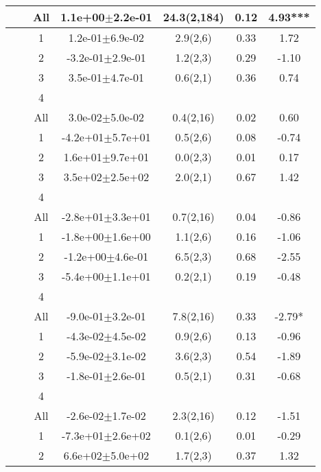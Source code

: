 \begin{longtable}{llccccS[table-format=-2.2, table-space-text-post = {***}]}
   &  & All &  1.1e+00$\pm$2.2e-01 & 24.3(2,184) & 0.12 & 4.93*** \\ 
   \midrule
{} & {} & 1 &  1.2e-01$\pm$6.9e-02 & 2.9(2,6) & 0.33 & 1.72 \\ 
   &  & 2 & -3.2e-01$\pm$2.9e-01 & 1.2(2,3) & 0.29 & -1.10 \\ 
   &  & 3 &  3.5e-01$\pm$4.7e-01 & 0.6(2,1) & 0.36 & 0.74 \\ 
   &  & 4 &  &  &  &  \\ 
   &  & All &  3.0e-02$\pm$5.0e-02 & 0.4(2,16) & 0.02 & 0.60 \\ 
   \midrule
{} & {} & 1 & -4.2e+01$\pm$5.7e+01 & 0.5(2,6) & 0.08 & -0.74 \\ 
   &  & 2 &  1.6e+01$\pm$9.7e+01 & 0.0(2,3) & 0.01 & 0.17 \\ 
   &  & 3 &  3.5e+02$\pm$2.5e+02 & 2.0(2,1) & 0.67 & 1.42 \\ 
   &  & 4 &  &  &  &  \\ 
   &  & All & -2.8e+01$\pm$3.3e+01 & 0.7(2,16) & 0.04 & -0.86 \\ 
   \midrule
{} & {} & 1 & -1.8e+00$\pm$1.6e+00 & 1.1(2,6) & 0.16 & -1.06 \\ 
   &  & 2 & -1.2e+00$\pm$4.6e-01 & 6.5(2,3) & 0.68 & -2.55 \\ 
   &  & 3 & -5.4e+00$\pm$1.1e+01 & 0.2(2,1) & 0.19 & -0.48 \\ 
   &  & 4 &  &  &  &  \\ 
   &  & All & -9.0e-01$\pm$3.2e-01 & 7.8(2,16) & 0.33 & -2.79* \\ 
   \midrule
{} & {} & 1 & -4.3e-02$\pm$4.5e-02 & 0.9(2,6) & 0.13 & -0.96 \\ 
   &  & 2 & -5.9e-02$\pm$3.1e-02 & 3.6(2,3) & 0.54 & -1.89 \\ 
   &  & 3 & -1.8e-01$\pm$2.6e-01 & 0.5(2,1) & 0.31 & -0.68 \\ 
   &  & 4 &  &  &  &  \\ 
   &  & All & -2.6e-02$\pm$1.7e-02 & 2.3(2,16) & 0.12 & -1.51 \\ 
   \midrule
{} & {} & 1 & -7.3e+01$\pm$2.6e+02 & 0.1(2,6) & 0.01 & -0.29 \\ 
   &  & 2 &  6.6e+02$\pm$5.0e+02 & 1.7(2,3) & 0.37 & 1.32 \\ 

\end{longtable}
